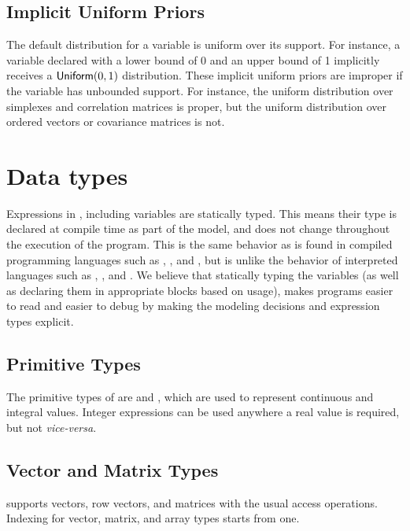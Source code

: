 \documentclass[article]{jss}
\begin{document}
\subsection{Implicit Uniform Priors}\label{implicit-prior.section}

The default distribution for a variable is uniform over its support.
For instance, a variable declared with a lower bound of 0 and an upper
bound of 1 implicitly receives a $\mbox{\sf Uniform}(0,1)$
distribution.  These implicit uniform priors are improper if the
variable has unbounded support.  For instance, the uniform
distribution over simplexes and correlation matrices is proper, but
the uniform distribution over ordered vectors or covariance matrices
is not. 


\section{Data types}

Expressions in , including variables are statically
typed.  This means their type is declared at compile time as part of
the model, and does not change throughout the execution of the
program.  This is the same behavior as is found in compiled
programming languages such as , ,
and , but is unlike the behavior of interpreted
languages such as , , and
.  We believe that statically typing the variables
(as well as declaring them in appropriate blocks based on usage),
makes  programs easier to read and easier to debug by
making the modeling decisions and expression types explicit.

\subsection{Primitive Types}

The primitive types of  are  and ,
which are used to represent continuous and integral values.  Integer
expressions can be used anywhere a real value is required, but not
{\it vice-versa}.

\subsection{Vector and Matrix Types}

 supports vectors, row vectors, and matrices with the
usual access operations.  Indexing for vector, matrix, and array types
starts from one.  
\end{document}
